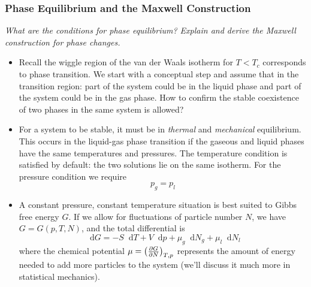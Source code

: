 \documentclass[11pt, a4paper]{article}
\newcommand{\diff}{\mathop{}\!\mathrm{d}} %
\newcommand{\pdveval}[3]{\left(\pdv{#1}{#2}\right)_{#3}}
\begin{document}
\subsubsection{Phase Equilibrium and the Maxwell Construction} \label{sss:liquid_gas_phase_equil}
\textit{What are the conditions for phase equilibrium? Explain and derive the Maxwell construction for phase changes.}

\begin{itemize}
	
	\item Recall the wiggle region of the van der Waals isotherm for $ T < T_{c} $ corresponds to phase transition. We start with a conceptual step and assume that in the transition region: part of the system could be in the liquid phase and part of the system could be in the gas phase. How to confirm the stable coexistence of two phases in the same system is allowed? 
	
	\item For a system to be stable, it must be in \textit{thermal} and \textit{mechanical} equilibrium. This occurs in the liquid-gas phase transition if the gaseous and liquid phases have the same temperatures and pressures. The temperature condition is satisfied by default: the two solutions lie on the same isotherm. For the pressure condition we require 
	\begin{equation*}
		p_{g} = p_{l}
	\end{equation*}
	
	\item A constant pressure, constant temperature situation is best suited to Gibbs free energy $ G $. If we allow for fluctuations of particle number $ N $, we have $ G = G(p, T, N) $, and the total differential is
	\begin{equation*}
		\diff G = - S \diff T + V \diff p + \mu_{g}\diff N_{g} + \mu_{l} \diff N_{l}
	\end{equation*}
	where the chemical potential $ \mu = \pdveval{G}{N}{T,p}$ represents the amount of energy needed to add more particles to the system (we'll discuss it much more in statistical mechanics). 
	

\end{itemize}
\end{document}
